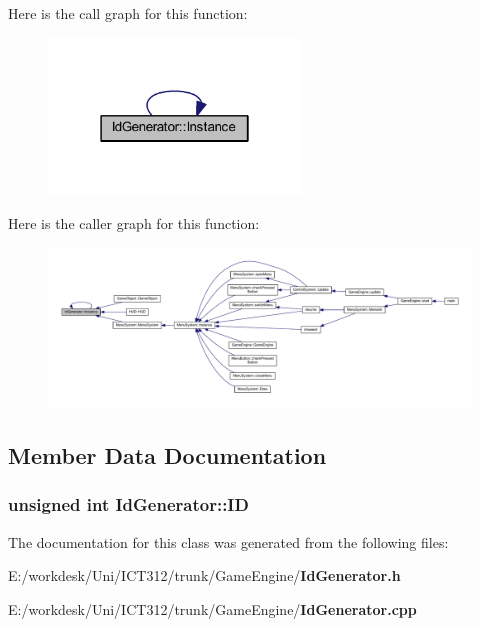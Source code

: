 Here is the call graph for this function\+:\nopagebreak
\begin{figure}[H]
\begin{center}
\leavevmode
\includegraphics[width=190pt]{d6/d57/class_id_generator_a0ae3ff56ccfa23f1471a07b02eb07804_cgraph}
\end{center}
\end{figure}




Here is the caller graph for this function\+:\nopagebreak
\begin{figure}[H]
\begin{center}
\leavevmode
\includegraphics[width=350pt]{d6/d57/class_id_generator_a0ae3ff56ccfa23f1471a07b02eb07804_icgraph}
\end{center}
\end{figure}




\subsection{Member Data Documentation}
\subsubsection[{I\+D}]{\setlength{\rightskip}{0pt plus 5cm}unsigned int Id\+Generator\+::\+I\+D\hspace{0.3cm}{\ttfamily [private]}}\label{class_id_generator_aed56ffb10b9996b98015c76566e1c94e}


The documentation for this class was generated from the following files\+:\begin{DoxyCompactItemize}
\item 
E\+:/workdesk/\+Uni/\+I\+C\+T312/trunk/\+Game\+Engine/{\bf Id\+Generator.\+h}\item 
E\+:/workdesk/\+Uni/\+I\+C\+T312/trunk/\+Game\+Engine/{\bf Id\+Generator.\+cpp}\end{DoxyCompactItemize}
